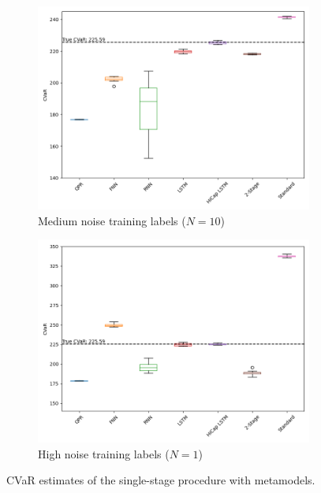 \begin{figure}[ht!]
    \centering
    \begin{subfigure}{0.48\textwidth}
        \includegraphics[width=\textwidth]{./project2/figures/singleStage/CVaRmediumNoise.png}
        \caption{Medium noise training labels ($N=10$)}
    \end{subfigure}
    \begin{subfigure}{0.48\textwidth}
        \includegraphics[width=\textwidth]{./project2/figures/singleStage/CVaRhighNoise.png}
        \caption{High noise training labels ($N=1$)}
    \end{subfigure}
    \caption{CVaR estimates of the single-stage procedure with metamodels.}
    \label{fig2:CVaRsingleStage}
\end{figure}

